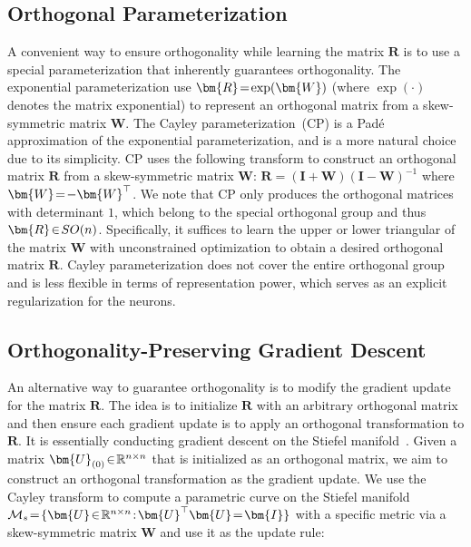 \subsection{Orthogonal Parameterization}

A convenient way to ensure orthogonality while learning the matrix $\bm{R}$ is to use a special parameterization that inherently guarantees orthogonality. The exponential parameterization use $\thickmuskip=2mu \medmuskip=2mu \bm{R}=\exp(\bm{W})$ (where $\exp(\cdot)$ denotes the matrix exponential) to represent an orthogonal matrix from a skew-symmetric matrix $\bm{W}$. The Cayley parameterization~(CP) is a Padé approximation of the exponential parameterization, and is a more natural choice due to its simplicity. CP uses the following transform to construct an orthogonal matrix $\bm{R}$ from a skew-symmetric matrix $\bm{W}$: $\bm{R} = (\bm{I}+\bm{W})(\bm{I}-\bm{W})^{-1}$ where $\thickmuskip=2mu \medmuskip=2mu\bm{W}=-\bm{W}^\top$. We note that CP only produces the orthogonal matrices with determinant $1$, which belong to the special orthogonal group and thus $\thickmuskip=2mu \medmuskip=2mu \bm{R}\in SO(n)$. Specifically, it suffices to learn the upper or lower triangular of the matrix $\bm{W}$ with unconstrained optimization to obtain a desired orthogonal matrix $\bm{R}$. Cayley parameterization does not cover the entire orthogonal group and is less flexible in terms of representation power, which serves as an explicit regularization for the neurons.

\subsection{Orthogonality-Preserving Gradient Descent}

An alternative way to guarantee orthogonality is to modify the gradient update for the matrix $\bm{R}$. The idea is to initialize $\bm{R}$ with an arbitrary orthogonal matrix and then ensure each gradient update is to apply an orthogonal transformation to $\bm{R}$. It is essentially conducting gradient descent on the Stiefel manifold~\cite{Li2020Efficient,wen2013feasible,wisdom2016full,lezcano2019cheap,arjovsky2016unitary,henaff2016recurrent,jing2017tunable}. Given a matrix $\thickmuskip=2mu \medmuskip=2mu \bm{U}_{(0)}\in\mathbb{R}^{n\times n}$ that is initialized as an orthogonal matrix, we aim to construct an orthogonal transformation as the gradient update. We use the Cayley transform to compute a parametric curve on the Stiefel manifold $\thickmuskip=2mu \medmuskip=2mu\mathcal{M}_s=\{ \bm{U}\in\mathbb{R}^{n\times n}: \bm{U}^\top\bm{U}=\bm{I} \}$ with a specific metric via a skew-symmetric matrix $\bm{W}$ and use it as the update rule:

